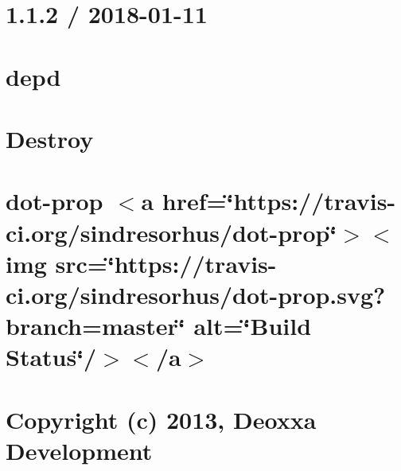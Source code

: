 \let\mypdfximage\pdfximage\def\pdfximage{\immediate\mypdfximage}\documentclass[twoside]{book}
\newcommand{\+}{\discretionary{\mbox{\scriptsize$\hookleftarrow$}}{}{}}
\begin{document}
\chapter{1.1.2 / 2018-\/01-\/11}
\label{md__c_1__git_hub__p_r_o_y_e_c_t_o-_i_i_i-_g_o_t_rest-api-node-mysql_node_modules_depd__history}

\chapter{depd}
\label{md__c_1__git_hub__p_r_o_y_e_c_t_o-_i_i_i-_g_o_t_rest-api-node-mysql_node_modules_depd__readme}

\chapter{Destroy}
\label{md__c_1__git_hub__p_r_o_y_e_c_t_o-_i_i_i-_g_o_t_rest-api-node-mysql_node_modules_destroy__r_e_a_d_m_e}

\chapter{dot-\/prop $<$a href=\char`\"{}https\+://travis-\/ci.\+org/sindresorhus/dot-\/prop\char`\"{}$>$$<$img src=\char`\"{}https\+://travis-\/ci.\+org/sindresorhus/dot-\/prop.\+svg?branch=master\char`\"{} alt=\char`\"{}\+Build Status\char`\"{}/$>$$<$/a$>$}
\label{md__c_1__git_hub__p_r_o_y_e_c_t_o-_i_i_i-_g_o_t_rest-api-node-mysql_node_modules_dot-prop_readme}

\chapter{Copyright (c) 2013, Deoxxa Development}
\label{md__c_1__git_hub__p_r_o_y_e_c_t_o-_i_i_i-_g_o_t_rest-api-node-mysql_node_modules_duplexer3__l_i_c_e_n_s_e}

\end{document}
